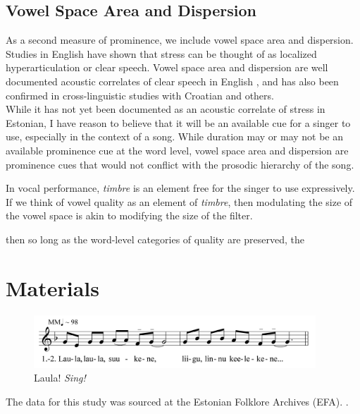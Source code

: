 \subsection{Vowel Space Area and Dispersion}

As a second measure of prominence, we include vowel space area and dispersion. Studies in English have shown that stress can be thought of as localized hyperarticulation or clear speech. \cite{deJong} Vowel space area and dispersion are well documented acoustic correlates of clear speech in English \cite{bradlow}, and has also been confirmed in cross-linguistic studies with Croatian \cite{rajka} and others. \\

While it has not yet been documented as an acoustic correlate of stress in Estonian, I have reason to believe that it will be an available cue for a singer to use, especially in the context of a song. While duration may or may not be an available prominence cue at the word level, vowel space area and dispersion are prominence cues that would not conflict with the prosodic hierarchy of the song. 

In vocal performance, {\it timbre} is an element free for the singer to use expressively. 
If we think of vowel quality as an element of {\it timbre}, then modulating the size of the vowel space is akin to modifying the size of the filter.

then so long as the word-level categories of quality are preserved, the 


\section{Materials}

\begin{figure}[htbp]
\centering
\includegraphics[width=300pt]{figures/055.png}
\caption{Laula! {\it Sing!}}
\label{default}
\end{figure}




The data for this study was sourced at the Estonian Folklore Archives (EFA). 
\citep{orasEstonianFolkloreArchives2022a}.



